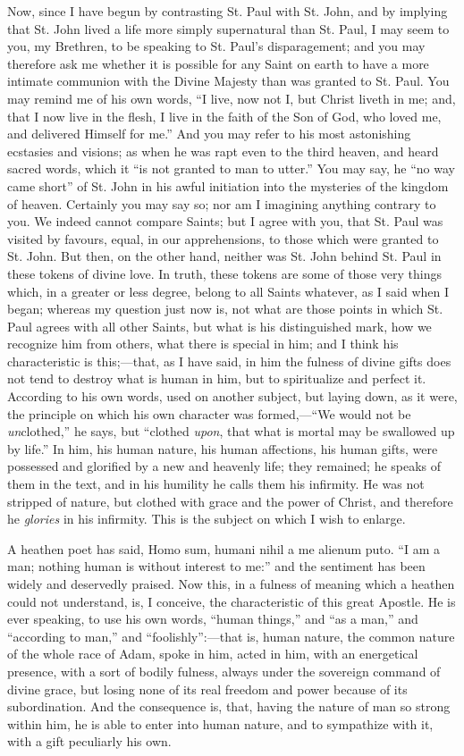 Now, since I have begun by contrasting St. Paul with
St. John, and by implying that St. John lived a life more
simply supernatural than St. Paul, I may seem to you, my
Brethren, to be speaking to St. Paul's disparagement; and
you may therefore ask me whether it is possible for any
Saint on earth to have a more intimate communion with the
Divine Majesty than was granted to St. Paul. You may
remind me of his own words, ``I live, now not I, but
Christ liveth in me; and, that I now live in the flesh, I
live in the faith of the Son of God, who loved me, and
delivered Himself for me.'' And you may refer to his
most astonishing ecstasies and visions; as when he was
rapt even to the third heaven, and heard sacred words,
which it ``is not granted to man to utter.'' You
may say, he ``no way came short'' of St. John in
his awful initiation into the mysteries of the kingdom of
heaven. Certainly you may say so; nor am I imagining
anything contrary to you. We indeed cannot compare
Saints; but I agree with you, that St. Paul was visited
by favours, equal, in our apprehensions, to those which
were granted to St. John. But then, on the other hand,
neither was St. John behind St. Paul in these tokens of
divine love. In truth, these tokens are some of those
very things which, in a greater or less degree, belong to
all Saints whatever, as I said when I began; whereas my
question just now is, not what are those points in which
St. Paul agrees with all other Saints, but what is his
distinguished mark, how we recognize him from others,
what there is special in him; and I think his
characteristic is this;—that, as I have said, in him
the fulness of divine gifts does not tend to destroy what
is human in him, but to spiritualize and perfect it.
According to his own words, used on another subject, but
laying down, as it were, the principle on which his own
character was formed,—``We would not be \emph{un}clothed,''
he says, but ``clothed \emph{upon}, that what is
mortal may be swallowed up by life.'' In him, his
human nature, his human affections, his human gifts, were
possessed and glorified by a new and heavenly life; they
remained; he speaks of them in the text, and in his
humility he calls them his infirmity. He was not stripped
of nature, but clothed with grace and the power of
Christ, and therefore he \emph{glories} in his infirmity.
This is the subject on which I wish to enlarge.

A heathen poet has said, Homo sum, humani nihil a me
alienum puto. ``I am a man; nothing human is without
interest to me:'' and the sentiment has been widely
and deservedly praised. Now this, in a fulness of meaning
which a heathen could not understand, is, I conceive, the
characteristic of this great Apostle. He is ever
speaking, to use his own words, ``human things,''
and ``as a man,'' and ``according to
man,'' and ``foolishly'':—that is, human
nature, the common nature of the whole race of Adam,
spoke in him, acted in him, with an energetical presence,
with a sort of bodily fulness, always under the sovereign
command of divine grace, but losing none of its real
freedom and power because of its subordination. And the
consequence is, that, having the nature of man so strong
within him, he is able to enter into human nature, and to
sympathize with it, with a gift peculiarly his own.

